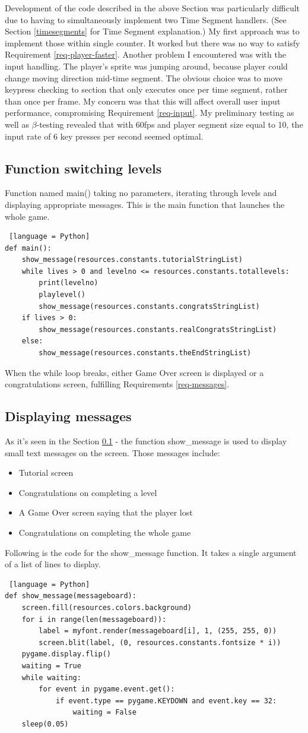 \documentclass[11pt,a4paper,notitlepage]{report}
\newcommand{\dsubsection}[1]{\FloatBarrier \subsection{#1}}
\begin{document}
				Development of the code described in the above Section was particularly difficult due to having to simultaneously implement two Time Segment handlers. (See Section \ref{timesegments} for Time Segment explanation.)
				My first approach was to implement those within single counter. It worked but there was no way to satisfy Requirement \ref{req-player-faster}.
				Another problem I encountered was with the input handling. The player's sprite was jumping around, because player could change moving direction mid-time segment. The obvious choice was to move keypress checking to section that only executes once per time segment, rather than once per frame. My concern was that this will affect overall user input performance, compromising Requirement \ref{req-input}. My preliminary testing as well as $\beta$-testing revealed that with 60fps and player segment size equal to 10, the input rate of 6 key presses per second seemed optimal.
			\dsubsection{Function switching levels}
				\label{main}
				Function named main() taking no parameters, iterating through levels and displaying appropriate messages. This is the main function that launches the whole game. 
				\begin{lstlisting} [language = Python]
def main():
	show_message(resources.constants.tutorialStringList)
	while lives > 0 and levelno <= resources.constants.totallevels:
		print(levelno)
		playlevel()
		show_message(resources.constants.congratsStringList)
	if lives > 0:
		show_message(resources.constants.realCongratsStringList)
	else:
		show_message(resources.constants.theEndStringList)
				\end{lstlisting}
				When the while loop breaks, either Game Over screen is displayed or a congratulations screen, fulfilling Requirements \ref{req-messages}.
			\dsubsection{Displaying messages}
				As it's seen in the Section \ref{main} - the function show\_message is used to display small text messages on the screen. Those messages include:
				\begin{itemize}
					\item
						Tutorial screen
					\item
						Congratulations on completing a level
					\item
						A Game Over screen saying that the player lost
					\item
						Congratulations on completing the whole game
				\end{itemize}
				Following is the code for the show\_message function. It takes a single argument of a list of lines to display.
				\begin{lstlisting} [language = Python]
def show_message(messageboard):
	screen.fill(resources.colors.background)
	for i in range(len(messageboard)):
		label = myfont.render(messageboard[i], 1, (255, 255, 0))
		screen.blit(label, (0, resources.constants.fontsize * i))
	pygame.display.flip()
	waiting = True
	while waiting:
		for event in pygame.event.get():
			if event.type == pygame.KEYDOWN and event.key == 32:
				waiting = False
	sleep(0.05)
				\end{lstlisting}
\end{document}
